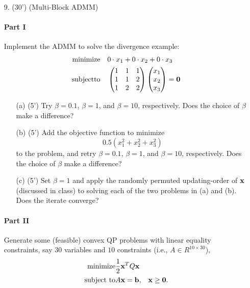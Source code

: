 \documentclass[12pt,letterpaper]{article}
\renewcommand\b{{\bf b}}
\newcommand\x{{\bf x}}
\newcommand\bz{{\bf 0}}
\begin{document}
\begin{enumerate}
\clearpage
\item [9.] (30') (Multi-Block ADMM)
\paragraph{Part I} Implement the ADMM to solve the divergence example:
\begin{equation*}
	\begin{aligned}
		\mathrm{minimize} \quad & 0 \cdot x_1 + 0 \cdot x_2 + 0 \cdot x_3 \\
		\mathrm{subject to} \quad & 
		\begin{pmatrix}
			1 & 1 & 1 \\
			1 & 1 & 2 \\
			1 & 2 & 2 \\
		\end{pmatrix}
		\begin{pmatrix}
			x_1 \\
			x_2 \\
			x_3 
		\end{pmatrix}
		= \bz
	\end{aligned}
\end{equation*}

\begin{enumerate}
\item[(a)] (5') Try $\beta=0.1$, $\beta=1$, and $\beta=10$, respectively. Does the choice of $\beta$ make a difference?

\item[(b)] (5') Add the objective function to minimize
\[0.5(x^2_1+x^2_2+x^2_3)\]
to the problem, and retry $\beta=0.1$, $\beta=1$, and $\beta=10$, respectively. Does the choice of $\beta$ make a difference?

\item[(c)] (5') Set $\beta=1$ and apply the randomly permuted updating-order of $\x$ (discussed in class) to solving each of the two problems in (a) and (b). Does the iterate converge?
\end{enumerate}

\paragraph{Part II} Generate some (feasible) convex QP problems with linear equality constraints, say $30$ variables and $10$ constraints (i.e., $A \in R^{10 \times 30}$),
\begin{eqnarray*}
\mbox{minimize}   & \frac{1}{2}\x^TQ\x &\\
\mbox{subject to} & A\x=\b,& \x\ge \bz.
\end{eqnarray*}


\end{enumerate}
\end{document}
